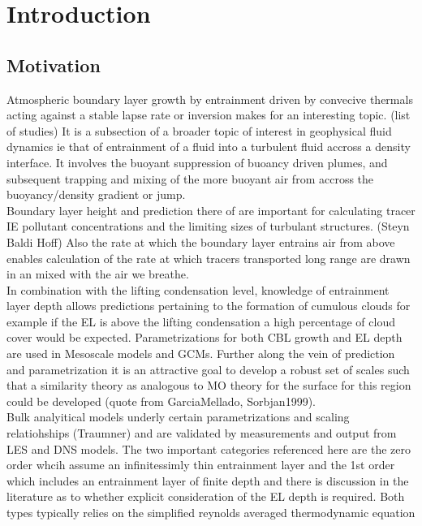 
\chapter{Introduction} 
\label{ch:Introduction}
\setlength{\parindent}{0cm}

\section{Motivation}
\label{sec:}

Atmospheric boundary layer growth by entrainment driven by convecive thermals acting against a stable lapse rate
or inversion makes for an interesting topic.  (list of studies) It is a subsection of a broader topic of interest in geophysical fluid dynamics ie that of entrainment of a fluid into a turbulent fluid accross a density interface.  It involves the buoyant suppression of buoancy driven plumes, and subsequent trapping and mixing of the more buoyant air from accross the buoyancy/density gradient or jump.\\

Boundary layer height and prediction there of are important for calculating tracer IE pollutant concentrations
and the limiting sizes of turbulant structures.  (Steyn Baldi Hoff) Also the rate at which the boundary layer entrains air from above
enables calculation of the rate at which tracers transported long range are drawn in an mixed with the air we breathe.\\

In combination with the lifting condensation level, knowledge of entrainment layer depth allows predictions pertaining
to the formation of cumulous clouds for example if the \acs{EL} is above the lifting condensation a high percentage of cloud cover
would be expected.  Parametrizations for both \acs{CBL} growth and \acs{EL} depth are used in Mesoscale models and GCMs.  Further along the vein of prediction and parametrization it is an attractive goal to develop a robust set of scales such that a similarity theory as analogous to MO theory for the surface for this region could be developed (quote from GarciaMellado, Sorbjan1999).\\

Bulk analyitical models underly certain parametrizations and scaling relatiohships (Traumner) and are validated by measurements 
and output from LES and DNS models. The two important categories referenced here are the zero order whcih
assume an infinitessimly thin entrainment layer and the 1st order which includes an entrainment layer of finite depth
and there is discussion in the literature as to whether explicit consideration of the \acs{EL} depth is required. Both
types typically relies on the simplified reynolds averaged thermodynamic equation 

